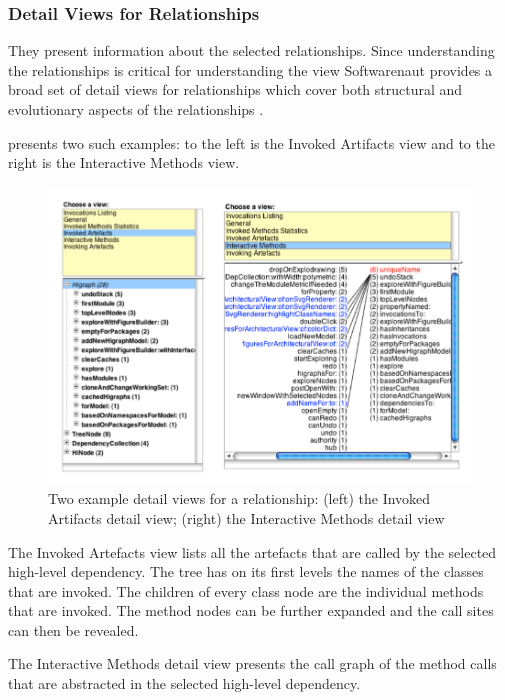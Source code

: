 \documentclass[preprint,12pt]{elsarticle}
\begin{document}
\subsubsection {Detail Views for Relationships}
They present information about the selected relationships. Since understanding the relationships is critical for understanding the view Softwarenaut provides a broad set of detail views for relationships which cover both structural and evolutionary aspects of the relationships \cite{lungu-cutedge, lungu-relevo}. 

 presents two such examples: to the left is the Invoked Artifacts view and to the right is the Interactive Methods view. 

\begin{figure}[h!]
\begin{center}
\includegraphics[width=0.9\linewidth]{images/DetailsForEdge}
\caption{Two example detail views for a relationship: (left) the Invoked Artifacts detail view; (right) the Interactive Methods detail view}
\end{center}
\end{figure}
The Invoked Artefacts view lists all the artefacts that are called by the selected high-level dependency. The tree has on its first levels the names of the classes that are invoked. The children of every class node are the individual methods that are invoked. The method nodes can be further expanded and the call sites can then be revealed. 

The Interactive Methods detail view presents the call graph of the method calls that are abstracted in the selected high-level dependency. 
\end{document}
